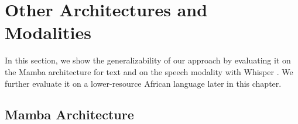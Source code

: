 \begin{table}[t]
    \caption{\textbf{Compressed models recover well when fine-tuned.} Zero-shot performance of the base non-compressed models (0\%) and the 40\% compressed models, without and with fine-tuning (FT). Models were fine-tuned on the whole Slim-Orca dataset (191 million tokens).}
    \label{tab:ft_result}
\end{table}


\section{Other Architectures and Modalities}
In this section, we show the generalizability of our approach by evaluating it on the Mamba architecture for text \citep{gu2024mambalineartimesequencemodeling} and on the speech modality with Whisper \citep{radford2022robustspeechrecognitionlargescale}.
We further evaluate it on a lower-resource African language later in this chapter.
\subsection{Mamba Architecture}


